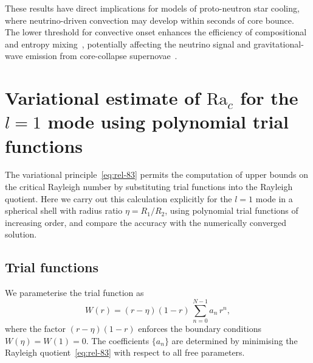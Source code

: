 These results have direct implications for models of proto-neutron
star cooling, where neutrino-driven convection may develop within
seconds of core bounce.  The lower threshold for convective onset
enhances the efficiency of compositional and entropy
mixing~\cite{PrakashEtAl2001}, potentially affecting the
neutrino signal and gravitational-wave emission from core-collapse
supernovae~\cite{OttEtAl2008}.

\section{Variational estimate of $\mathrm{Ra}_c$ for the $l=1$ mode
  using polynomial trial functions}
\label{sec:rel-58-variational-l1}

The variational principle~\eqref{eq:rel-83} permits the computation of
upper bounds on the critical Rayleigh number by substituting trial
functions into the Rayleigh quotient.  Here we carry out this
calculation explicitly for the $l=1$ mode in a spherical shell with
radius ratio $\eta = R_1/R_2$, using polynomial trial functions of
increasing order, and compare the accuracy with the numerically
converged solution.

\subsection{Trial functions}
\label{sec:rel-58-var-trial}

We parameterise the trial function as
\begin{equation}
W(r) = (r - \eta)(1 - r)\,\sum_{n=0}^{N-1} a_n\,r^n,
\label{eq:rel-var-trial}
\end{equation}
where the factor $(r-\eta)(1-r)$ enforces the boundary conditions
$W(\eta) = W(1) = 0$.  The coefficients $\{a_n\}$ are determined by
minimising the Rayleigh quotient~\eqref{eq:rel-83} with respect to all
free parameters.

